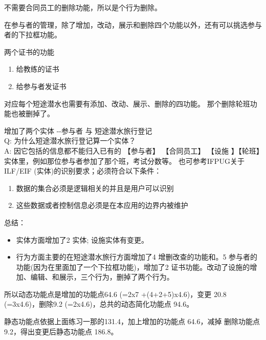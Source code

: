 不需要合同员工的删除功能，所以是个行为删除。

在参与者的管理，除了增加，改动，展示和删除四个功能以外，还有可以挑选参与者的下拉框功能。

两个证书的功能

\begin{enumerate}
\tightlist
\item
  给教练的证书
\item
  给参与者发证书
\end{enumerate}

对应每个短途潜水也需要有添加、改动、展示、删除的四功能。
那个删除轮班功能也被删掉了。

增加了两个实体 -\/-参与者 与 短途潜水旅行登记\\
Q: 为什么短途潜水旅行登记算一个实体？\\
A: 因它包括的信息都不能归入已有的 【参与者】 【合同员工】 【设施
】【轮班】实体里，例如那位参与者参加了那个班，考试分数等。
也可参考IFPUG关于ILF/EIF (实体)的识别要求；必须符合以下条件：

\begin{enumerate}
\tightlist
\item
  数据的集合必须是逻辑相关的并且是用户可以识别
\item
  这些数据或者控制信息必须是在本应用的边界内被维护
\end{enumerate}

总结：

\begin{itemize}
\tightlist
\item
  实体方面增加了2 实体; 设施实体有变更。
\item
  行为方面主要的在短途潜水旅行方面增加了4 增删改查的功能和。5
  参与者的功能(因为在里面加了一个下拉框功能)，增加了2
  证书功能。改动了设施的增加、编辑、和展示，三个行为，删掉了两个行为。
\end{itemize}

所以动态功能点是增加的功能点64.6 (=2x7 +(4+2+5)x4.6)，变更 20.8
(=3x4.6)，删除9.2 (=2x4.6)，总共的动态简化功能点 94.6。

静态功能点依据上面练习一那的131.4，加上增加的功能点 64.6，减掉
删除功能点 9.2，得出变更后静态功能点 186.8。


